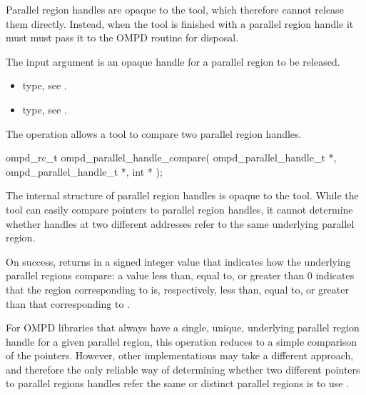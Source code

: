 \descr
Parallel region handles are opaque to the tool, which therefore
cannot release them directly. Instead, when the tool is finished with a parallel region handle
it must must pass it to the OMPD 
routine for disposal.

\argdesc
The input argument  is an opaque handle for a parallel region
to be released.

\crossreferences
\begin{itemize}
	\item {} type, see 
	.
	\item {} type, see .
\end{itemize}

\label{subsubsubsec:ompd_parallel_handle_compare}
\summary
The  operation allows a tool to compare two
parallel region handles.

\format

\begin{cspecific}
\begin{ompSyntax}
ompd_rc_t ompd_parallel_handle_compare(
  ompd_parallel_handle_t *,
  ompd_parallel_handle_t *,
  int *
);
\end{ompSyntax}
\end{cspecific}


\descr
The internal structure of parallel region handles is opaque to the tool. While the tool can easily
compare pointers to parallel region handles, it cannot determine whether handles at two different
addresses refer to the same underlying parallel region.

On success,  returns in  a signed
integer value that indicates how the underlying parallel regions compare: a value less than, equal
to, or greater than 0 indicates that the region corresponding to  is,
respectively, less than, equal to, or greater than that corresponding to .

For OMPD libraries that always have a single, unique, underlying parallel region handle for
a given parallel region, this operation reduces to a simple comparison of the pointers. However,
other implementations may take a different approach, and therefore the only reliable way of
determining whether two different pointers to parallel regions handles refer the same or distinct
parallel regions is to use .

